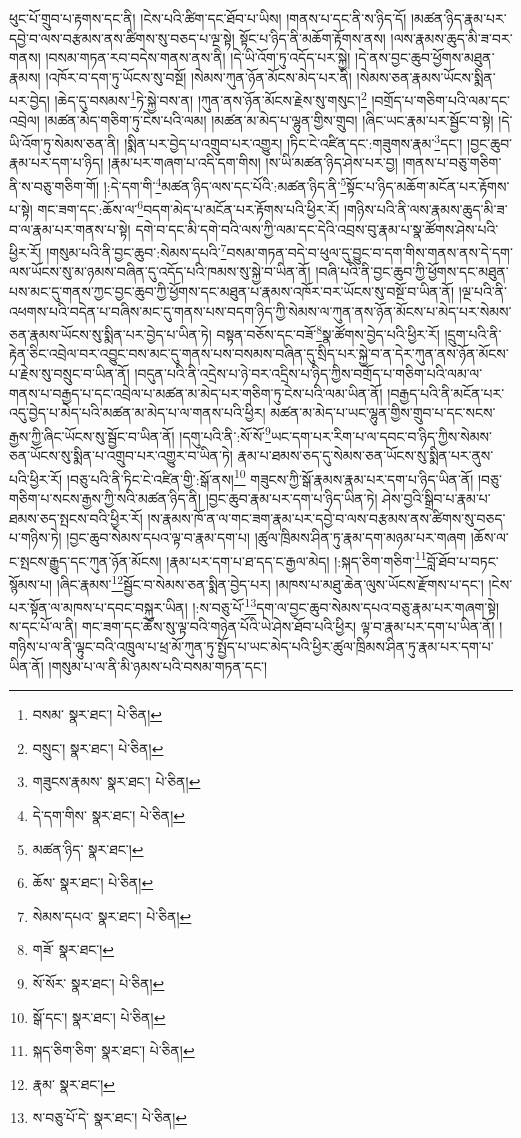 ཕུང་པོ་གྲུབ་པ་རྟགས་དང་ནི། །ངེས་པའི་ཚིག་དང་ཐོབ་པ་ཡིས། །གནས་པ་དང་ནི་ས་ཉིད་དོ། །མཚན་ཉིད་རྣམ་པར་དབྱེ་བ་ལས་བརྩམས་ནས་ཚིགས་སུ་བཅད་པ་ལྔ་སྟེ། སྟོང་པ་ཉིད་ནི་མཆོག་རྟོགས་ནས། །ལས་རྣམས་ཆུད་མི་ཟ་བར་གནས། །བསམ་གཏན་རབ་བདེས་གནས་ནས་ནི། །དེ་ཡི་འོག་ཏུ་འདོད་པར་སྐྱེ། །དེ་ནས་བྱང་ཆུབ་ཕྱོགས་མཐུན་རྣམས། །འཁོར་བ་དག་ཏུ་ཡོངས་སུ་བསྔོ། །སེམས་ཀུན་ཉོན་མོངས་མེད་པར་ནི། །སེམས་ཅན་རྣམས་ཡོངས་སྨིན་པར་བྱེད། །ཆེད་དུ་བསམས་\footnote{བསམ་  སྣར་ཐང་།  པེ་ཅིན། }ཏེ་སྐྱེ་བས་ན། །ཀུན་ནས་ཉོན་མོངས་རྗེས་སུ་གསུང་།\footnote{བསྲུང་།  སྣར་ཐང་།  པེ་ཅིན། } །བགྲོད་པ་གཅིག་པའི་ལམ་དང་འབྲེལ། །མཚན་མེད་གཅིག་ཏུ་ངེས་པའི་ལམ། །མཚན་མ་མེད་པ་ལྷུན་གྱིས་གྲུབ། །ཞིང་ཡང་རྣམ་པར་སྦྱོང་བ་སྟེ། །དེ་ཡི་འོག་ཏུ་སེམས་ཅན་ནི། །སྨིན་པར་བྱེད་པ་འགྲུབ་པར་འགྱུར། །ཏིང་ངེ་འཛིན་དང་:གཟུགས་རྣམ་\footnote{གཟུངས་རྣམས་  སྣར་ཐང་།  པེ་ཅིན། }དང་། །བྱང་ཆུབ་རྣམ་པར་དག་པ་ཉིད། །རྣམ་པར་གཞག་པ་འདི་དག་གིས། །ས་ཡི་མཚན་ཉིད་ཤེས་པར་བྱ། །གནས་པ་བཅུ་གཅིག་ནི་ས་བཅུ་གཅིག་གོ། །:དེ་དག་གི་\footnote{དེ་དག་གིས་  སྣར་ཐང་།  པེ་ཅིན། }མཚན་ཉིད་ལས་དང་པོའི་:མཚན་ཉིད་ནི་\footnote{མཚན་ཉིད་  སྣར་ཐང་། }སྟོང་པ་ཉིད་མཆོག་མངོན་པར་རྟོགས་པ་སྟེ། གང་ཟག་དང་:ཆོས་ལ་\footnote{ཆོས་  སྣར་ཐང་།  པེ་ཅིན། }བདག་མེད་པ་མངོན་པར་རྟོགས་པའི་ཕྱིར་རོ། །གཉིས་པའི་ནི་ལས་རྣམས་ཆུད་མི་ཟ་བ་ལ་རྣམ་པར་གནས་པ་སྟེ། དགེ་བ་དང་མི་དགེ་བའི་ལས་ཀྱི་ལམ་དང་དེའི་འབྲས་བུ་རྣམ་པ་སྣ་ཚོགས་ཤེས་པའི་ཕྱིར་རོ། །གསུམ་པའི་ནི་བྱང་ཆུབ་:སེམས་དཔའི་\footnote{སེམས་དཔའ་  སྣར་ཐང་།  པེ་ཅིན། }བསམ་གཏན་བདེ་བ་ཕུལ་དུ་བྱུང་བ་དག་གིས་གནས་ནས་དེ་དག་ལས་ཡོངས་སུ་མ་ཉམས་བཞིན་དུ་འདོད་པའི་ཁམས་སུ་སྐྱེ་བ་ཡིན་ནོ། །བཞི་པའི་ནི་བྱང་ཆུབ་ཀྱི་ཕྱོགས་དང་མཐུན་པས་མང་དུ་གནས་ཀྱང་བྱང་ཆུབ་ཀྱི་ཕྱོགས་དང་མཐུན་པ་རྣམས་འཁོར་བར་ཡོངས་སུ་བསྔོ་བ་ཡིན་ནོ། །ལྔ་པའི་ནི་འཕགས་པའི་བདེན་པ་བཞིས་མང་དུ་གནས་པས་བདག་ཉིད་ཀྱི་སེམས་ལ་ཀུན་ནས་ཉོན་མོངས་པ་མེད་པར་སེམས་ཅན་རྣམས་ཡོངས་སུ་སྨིན་པར་བྱེད་པ་ཡིན་ཏེ། བསྟན་བཅོས་དང་བཟོ་\footnote{གཟོ་  སྣར་ཐང་། }སྣ་ཚོགས་བྱེད་པའི་ཕྱིར་རོ། །དྲུག་པའི་ནི་རྟེན་ཅིང་འབྲེལ་བར་འབྱུང་བས་མང་དུ་གནས་པས་བསམས་བཞིན་དུ་སྲིད་པར་སྐྱེ་བ་ན་དེར་ཀུན་ནས་ཉོན་མོངས་པ་རྗེས་སུ་བསྲུང་བ་ཡིན་ནོ། །བདུན་པའི་ནི་འདྲེས་པ་ཉེ་བར་འདྲིས་པ་ཉིད་ཀྱིས་བགྲོད་པ་གཅིག་པའི་ལམ་ལ་གནས་པ་བརྒྱད་པ་དང་འབྲེལ་པ་མཚན་མ་མེད་པར་གཅིག་ཏུ་ངེས་པའི་ལམ་ཡིན་ནོ། །བརྒྱད་པའི་ནི་མངོན་པར་འདུ་བྱེད་པ་མེད་པའི་མཚན་མ་མེད་པ་ལ་གནས་པའི་ཕྱིར། མཚན་མ་མེད་པ་ཡང་ལྷུན་གྱིས་གྲུབ་པ་དང་སངས་རྒྱས་ཀྱི་ཞིང་ཡོངས་སུ་སྦྱོང་བ་ཡིན་ནོ། །དགུ་པའི་ནི་:སོ་སོ་\footnote{སོ་སོར་  སྣར་ཐང་།  པེ་ཅིན། }ཡང་དག་པར་རིག་པ་ལ་དབང་བ་ཉིད་ཀྱིས་སེམས་ཅན་ཡོངས་སུ་སྨིན་པ་འགྲུབ་པར་འགྱུར་བ་ཡིན་ཏེ། རྣམ་པ་ཐམས་ཅད་དུ་སེམས་ཅན་ཡོངས་སུ་སྨིན་པར་ནུས་པའི་ཕྱིར་རོ། །བཅུ་པའི་ནི་ཏིང་ངེ་འཛིན་གྱི་:སྒོ་ནས།\footnote{སྒོ་དང་།  སྣར་ཐང་།  པེ་ཅིན། } གཟུངས་ཀྱི་སྒོ་རྣམས་རྣམ་པར་དག་པ་ཉིད་ཡིན་ནོ། །བཅུ་གཅིག་པ་སངས་རྒྱས་ཀྱི་སའི་མཚན་ཉིད་ནི། །བྱང་ཆུབ་རྣམ་པར་དག་པ་ཉིད་ཡིན་ཏེ། ཤེས་བྱའི་སྒྲིབ་པ་རྣམ་པ་ཐམས་ཅད་སྤངས་བའི་ཕྱིར་རོ། །ས་རྣམས་ཁོ་ན་ལ་གང་ཟག་རྣམ་པར་དབྱེ་བ་ལས་བརྩམས་ནས་ཚིགས་སུ་བཅད་པ་གཉིས་ཏེ། །བྱང་ཆུབ་སེམས་དཔའ་ལྟ་བ་རྣམ་དག་པ། །ཚུལ་ཁྲིམས་ཤིན་ཏུ་རྣམ་དག་མཉམ་པར་གཞག །ཆོས་ལ་ང་སྤངས་རྒྱུད་དང་ཀུན་ཉོན་མོངས། །རྣམ་པར་དག་པ་ཐ་དད་ང་རྒྱལ་མེད། །:སྐད་ཅིག་གཅིག་\footnote{སྐད་ཅིག་ཅིག་  སྣར་ཐང་།  པེ་ཅིན། }བློ་ཐོབ་པ་བཏང་སྙོམས་པ། །ཞིང་རྣམས་\footnote{རྣམ་  སྣར་ཐང་། }སྦྱོང་བ་སེམས་ཅན་སྨིན་བྱེད་པར། །མཁས་པ་མཐུ་ཆེན་ལུས་ཡོངས་རྫོགས་པ་དང་། །ངེས་པར་སྟོན་ལ་མཁས་པ་དབང་བསྐུར་ཡིན། །:ས་བཅུ་པོ་\footnote{ས་བཅུ་པོ་དེ་  སྣར་ཐང་།  པེ་ཅིན། }དག་ལ་བྱང་ཆུབ་སེམས་དཔའ་བཅུ་རྣམ་པར་གཞག་སྟེ། ས་དང་པོ་ལ་ནི། གང་ཟག་དང་ཆོས་སུ་ལྟ་བའི་གཉེན་པོའི་ཡེ་ཤེས་ཐོབ་པའི་ཕྱིར། ལྟ་བ་རྣམ་པར་དག་པ་ཡིན་ནོ། །གཉིས་པ་ལ་ནི་ལྟུང་བའི་འཁྲུལ་པ་ཕྲ་མོ་ཀུན་ཏུ་སྤྱོད་པ་ཡང་མེད་པའི་ཕྱིར་ཚུལ་ཁྲིམས་ཤིན་ཏུ་རྣམ་པར་དག་པ་ཡིན་ནོ། །གསུམ་པ་ལ་ནི་མི་ཉམས་པའི་བསམ་གཏན་དང་། 